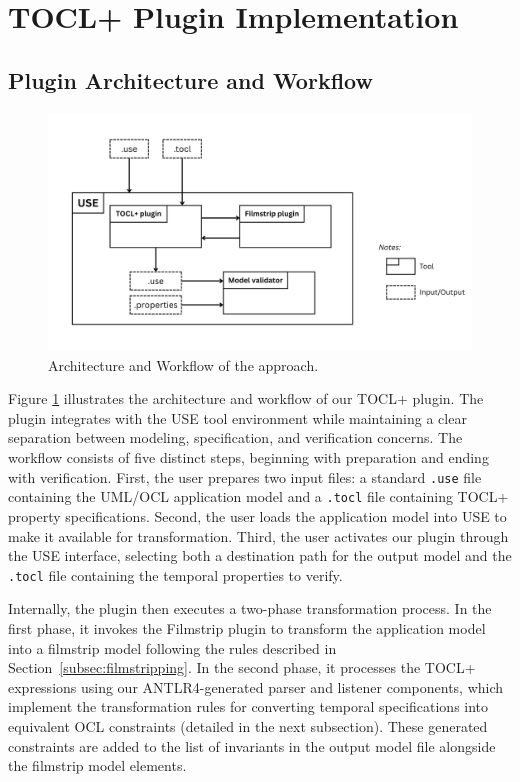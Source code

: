 \section{TOCL+ Plugin Implementation}

\subsection{Plugin Architecture and Workflow}

\begin{figure}
    \centering
    \includegraphics[width=1\textwidth]{figures/c3/Architecture_overview.png}
    \caption{Architecture and Workflow of the approach.}
    \label{sec:plugin_architecture}
\end{figure}

\hspace{1cm} Figure \ref{sec:plugin_architecture} illustrates the architecture and 
workflow of our TOCL+ plugin. The plugin integrates with the USE tool environment 
while maintaining a clear separation between modeling, specification, and 
verification concerns. The workflow consists of five distinct steps, beginning with 
preparation and ending with verification. First, the user prepares two input files: 
a standard \texttt{.use} file containing the UML/OCL application model and a 
\texttt{.tocl} file containing TOCL+ property specifications. Second, the user loads 
the application model into USE to make it available for transformation. Third, 
the user activates our plugin through the USE interface, selecting both a destination 
path for the output model and the \texttt{.tocl} file containing the temporal 
properties to verify.

Internally, the plugin then executes a two-phase transformation process. In the first 
phase, it invokes the Filmstrip plugin to transform the application model into a 
filmstrip model following the rules described in Section~\ref{subsec:filmstripping}. 
In the second phase, it processes the TOCL+ expressions using our ANTLR4-generated 
parser and listener components, which implement the transformation rules for 
converting temporal specifications into equivalent OCL constraints (detailed in the 
next subsection). These generated constraints are added to the list of invariants in 
the output model file alongside the filmstrip model elements.

